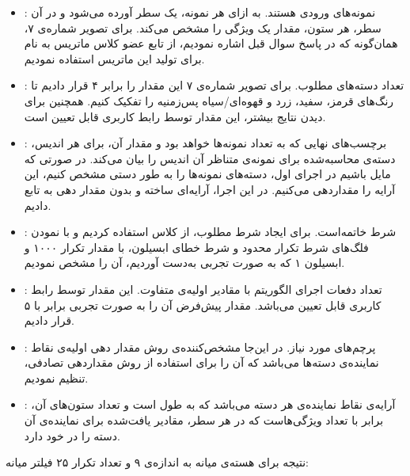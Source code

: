 \documentclass[12pt,a4paper]{article}
\theoremstyle{definition}
\theoremstyle{theorem}
\theoremstyle{definition}
\begin{document}
\begin{itemize}
\renewcommand{\labelitemi}{$\bullet$}
\item {}: نمونه‌های ورودی هستند. به ازای هر نمونه، یک سطر آورده می‌شود و در آن سطر، هر ستون، مقدار یک ویژگی را مشخص می‌کند. برای تصویر شماره‌ی ۷، همان‌گونه که در پاسخ سوال قبل اشاره نمودیم، از تابع عضو کلاس ماتریس به نام  برای تولید این ماتریس استفاده نمودیم.
\item {}: تعداد دسته‌های مطلوب. برای تصویر شماره‌ی ۷ این مقدار را برابر ۴ قرار دادیم تا رنگ‌های قرمز، سفید، زرد و قهوه‌ای/سیاه پس‌زمنیه را تفکیک کنیم. همچنین برای دیدن نتایج بیشتر، این مقدار توسط رابط کاربری قابل تعیین است.
\item {}: برچسب‌های نهایی که به تعداد نمونه‌ها خواهد بود و مقدار آن، برای هر اندیس، دسته‌ی محاسبه‌شده برای نمونه‌ی متناظر آن اندیس را بیان می‌کند. 
در صورتی که مایل باشیم در اجرای اول، دسته‌های نمونه‌ها را به طور دستی مشخص کنیم، این آرایه را مقداردهی می‌کنیم. در این اجرا، آرایه‌ای ساخته و بدون مقدار دهی به تابع دادیم.
\item {}: شرط خاتمه‌است. برای ایجاد شرط مطلوب، از کلاس 
استفاده کردیم و با  نمودن فلگ‌های شرط تکرار محدود و شرط خطای ابسیلون، با مقدار تکرار ۱۰۰۰ و ابسیلون ۱ که به صورت تجربی به‌دست آوردیم، آن را مشخص نمودیم. 
\item {}: تعداد دفعات اجرای الگوریتم با مقادیر اولیه‌ی متفاوت. این مقدار توسط رابط کاربری قابل تعیین می‌باشد. مقدار پیش‌فرض آن را به صورت تجربی برابر با ۵ قرار دادیم.
\item {}: پرچم‌های مورد نیاز. در این‌جا مشخص‌کننده‌ی روش مقدار دهی اولیه‌ی نقاط نماینده‌ی دسته‌ها می‌باشد که آن‌ را برای استفاده از روش مقداردهی تصادفی، تنظیم نمودیم.
\item {}: آرایه‌ی نقاط نماینده‌ی هر دسته‌ می‌باشد که به طول  است و تعداد ستون‌های آن، برابر با تعداد ویژگی‌هاست که در هر سطر، مقادیر یافت‌شده‌ برای نماینده‌ی آن دسته را در خود دارد.
\end{itemize}

نتیجه برای هسته‌ی میانه به اندازه‌ی ۹ و تعداد تکرار ۲۵ فیلتر میانه:
\end{document}
